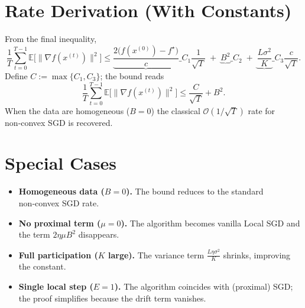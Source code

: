 \documentclass[11pt]{article}
\newcommand{\E}{\mathbb{E}}
\begin{document}
\section*{Rate Derivation (With Constants)}
From the final inequality,
\[
\frac{1}{T}\sum_{t=0}^{T-1}\E\!\bigl[\|\nabla f(x^{(t)})\|^{2}\bigr]
\le
\underbrace{\frac{2\bigl(f(x^{(0)})-f^{\star}\bigr)}{c}}\_{C_{1}}
\frac{1}{\sqrt{T}}
\;+\;
\underbrace{B^{2}}\_{C_{2}}
\;+\;
\underbrace{\frac{L\sigma^{2}}{K}}\_{C_{3}}\frac{c}{\sqrt{T}}.
\]
Define $C:=\max\{C_{1},C_{3}\}$; the bound reads
\[
\frac{1}{T}\sum_{t=0}^{T-1}\E\!\bigl[\|\nabla f(x^{(t)})\|^{2}\bigr]
\le
\frac{C}{\sqrt{T}}+B^{2}.
\]
When the data are homogeneous ($B=0$) the classical $\mathcal O(1/\sqrt{T})$ rate for non‑convex SGD is recovered.

\section*{Special Cases}
\begin{itemize}
\item \textbf{Homogeneous data ($B=0$).} The bound reduces to the standard non‑convex SGD rate.
\item \textbf{No proximal term ($\mu=0$).} The algorithm becomes vanilla Local SGD and the term $2\eta\mu B^{2}$ disappears.
\item \textbf{Full participation ($K$ large).} The variance term $\frac{L\eta\sigma^{2}}{K}$ shrinks, improving the constant.
\item \textbf{Single local step ($E=1$).} The algorithm coincides with (proximal) SGD; the proof simplifies because the drift term vanishes.
\end{itemize}
\end{document}
